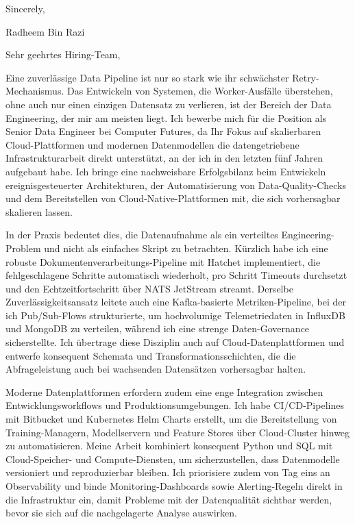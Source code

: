 \documentclass[11pt,a4paper]{coverletter}
\begin{document}
\closing{Sincerely,}{Radheem Bin Razi}

\clearpage
{}


\opening{Sehr geehrtes Hiring-Team,}

Eine zuverlässige Data Pipeline ist nur so stark wie ihr schwächster Retry-Mechanismus. Das Entwickeln von Systemen, die Worker-Ausfälle überstehen, ohne auch nur einen einzigen Datensatz zu verlieren, ist der Bereich der Data Engineering, der mir am meisten liegt. Ich bewerbe mich für die Position als Senior Data Engineer bei Computer Futures, da Ihr Fokus auf skalierbaren Cloud-Plattformen und modernen Datenmodellen die datengetriebene Infrastrukturarbeit direkt unterstützt, an der ich in den letzten fünf Jahren aufgebaut habe. Ich bringe eine nachweisbare Erfolgsbilanz beim Entwickeln ereignisgesteuerter Architekturen, der Automatisierung von Data-Quality-Checks und dem Bereitstellen von Cloud-Native-Plattformen mit, die sich vorhersagbar skalieren lassen.

In der Praxis bedeutet dies, die Datenaufnahme als ein verteiltes Engineering-Problem und nicht als einfaches Skript zu betrachten. Kürzlich habe ich eine robuste Dokumentenverarbeitungs-Pipeline mit Hatchet implementiert, die fehlgeschlagene Schritte automatisch wiederholt, pro Schritt Timeouts durchsetzt und den Echtzeitfortschritt über NATS JetStream streamt. Derselbe Zuverlässigkeitsansatz leitete auch eine Kafka-basierte Metriken-Pipeline, bei der ich Pub/Sub-Flows strukturierte, um hochvolumige Telemetriedaten in InfluxDB und MongoDB zu verteilen, während ich eine strenge Daten-Governance sicherstellte. Ich übertrage diese Disziplin auch auf Cloud-Datenplattformen und entwerfe konsequent Schemata und Transformationsschichten, die die Abfrageleistung auch bei wachsenden Datensätzen vorhersagbar halten.

Moderne Datenplattformen erfordern zudem eine enge Integration zwischen Entwicklungsworkflows und Produktionsumgebungen. Ich habe CI/CD-Pipelines mit Bitbucket und Kubernetes Helm Charts erstellt, um die Bereitstellung von Training-Managern, Modellservern und Feature Stores über Cloud-Cluster hinweg zu automatisieren. Meine Arbeit kombiniert konsequent Python und SQL mit Cloud-Speicher- und Compute-Diensten, um sicherzustellen, dass Datenmodelle versioniert und reproduzierbar bleiben. Ich priorisiere zudem von Tag eins an Observability und binde Monitoring-Dashboards sowie Alerting-Regeln direkt in die Infrastruktur ein, damit Probleme mit der Datenqualität sichtbar werden, bevor sie sich auf die nachgelagerte Analyse auswirken.
\end{document}
